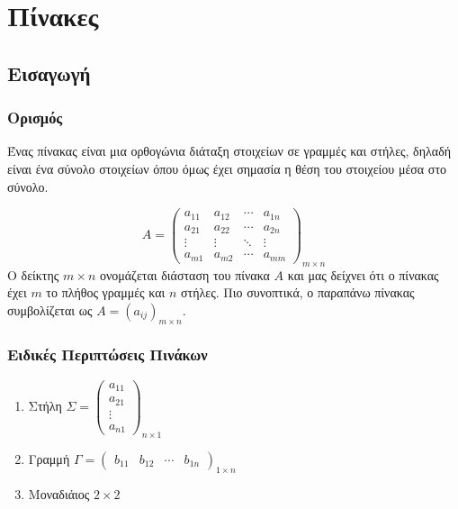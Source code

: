 






\chapter{Πίνακες}

\section{Εισαγωγή}

\subsection{Ορισμός}

Ένας πίνακας είναι μια ορθογώνια διάταξη στοιχείων σε γραμμές και στήλες,
δηλαδή είναι ένα σύνολο στοιχείων όπου όμως έχει σημασία η θέση του στοιχείου
μέσα στο σύνολο.

\[
	A = \begin{pmatrix*}
		a_{11} & a_{12} & \cdots & a_{1n} \\
		a_{21} & a_{22} & \cdots & a_{2n} \\
		\vdots & \vdots & \ddots & \vdots \\
		a_{m1} & a_{m2} & \cdots & a_{mm}
	\end{pmatrix*}_{m\times n} 
\] 
Ο δείκτης $ m\times n $ ονομάζεται διάσταση του πίνακα $ A $ και μας δείχνει ότι
ο πίνακας έχει $ m $ το πλήθος γραμμές και $n$ στήλες.
Πιο συνοπτικά, ο παραπάνω πίνακας συμβολίζεται ως $ A = (a_{ij})_{m\times
n} $.


\subsection{Ειδικές Περιπτώσεις Πινάκων}

	
\begin{enumerate}
	\item  Στήλη $ \Sigma = \begin{pmatrix}
			a_{11} \\
			a_{21} \\
			\vdots \\
			a_{n1}
		\end{pmatrix}_{n\times 1}$

	\item  Γραμμή $ \Gamma  = \begin{pmatrix}
			b_{11} & b_{12} & \cdots & b_{1n}
		\end{pmatrix}_{1\times n} $

	\item Μοναδιάιος $ 2\times 2 $ 
\end{enumerate}



